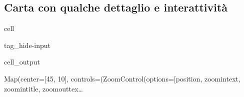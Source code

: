 \documentclass[letterpaper,10pt,italian]{jupyterBook}
\begin{document}
\subsection{Carta con qualche dettaglio e interattività}
\label{\detokenize{ch/history-test:carta-con-qualche-dettaglio-e-interattivita}}
\begin{sphinxuseclass}{cell}
\begin{sphinxuseclass}{tag_hide-input}\begin{sphinxVerbatimOutput}

\begin{sphinxuseclass}{cell_output}
\begin{sphinxVerbatim}[commandchars=\\\{\}]
Map(center=[45, 10], controls=(ZoomControl(options=[\PYGZsq{}position\PYGZsq{}, \PYGZsq{}zoom\PYGZus{}in\PYGZus{}text\PYGZsq{}, \PYGZsq{}zoom\PYGZus{}in\PYGZus{}title\PYGZsq{}, \PYGZsq{}zoom\PYGZus{}out\PYGZus{}tex…
\end{sphinxVerbatim}

\end{sphinxuseclass}\end{sphinxVerbatimOutput}

\end{sphinxuseclass}
\end{sphinxuseclass}






\renewcommand{\indexname}{Indice}
\printindex
\end{document}
